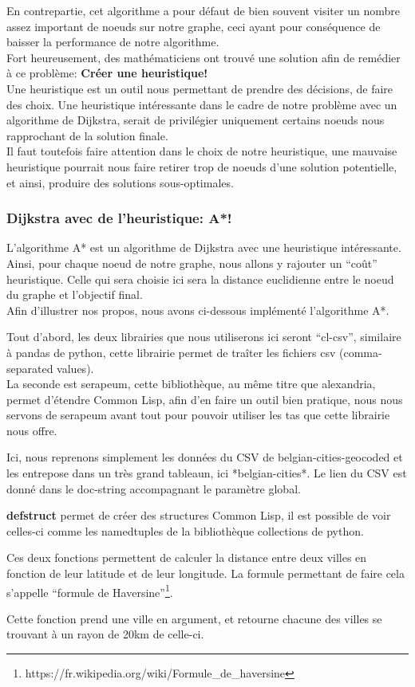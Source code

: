 \documentclass[a4paper, 12pt]{article}
\newcommand{\pather}[1]{
  
}
\numberwithin{equation}{subsection}
\begin{document}
En contrepartie, cet algorithme a pour défaut de bien souvent visiter un nombre assez important de noeuds sur notre graphe, ceci ayant pour conséquence de baisser la performance de notre algorithme. \\

Fort heureusement, des mathématiciens ont trouvé une solution afin de remédier à ce problème: {\bf Créer une heuristique!} \\

Une heuristique est un outil nous permettant de prendre des décisions, de faire des choix. Une heuristique intéressante dans le cadre de notre problème avec un algorithme de Dijkstra, serait de privilégier uniquement certains noeuds nous rapprochant de la solution finale. \\

Il faut toutefois faire attention dans le choix de notre heuristique,
une mauvaise heuristique pourrait nous faire retirer trop de noeuds d'une solution potentielle, et ainsi, produire des solutions sous-optimales. \\
\subsubsection{Dijkstra avec de l'heuristique: A*!}
L'algorithme A* est un algorithme de Dijkstra avec une heuristique intéressante. \\

Ainsi, pour chaque noeud de notre graphe, nous allons y rajouter un ``coût'' heuristique. Celle qui sera choisie ici sera la distance euclidienne entre le noeud du graphe et l'objectif final. \\
Afin d'illustrer nos propos, nous avons ci-dessous implémenté l'algorithme A*.
\pather{1-2}
Tout d'abord, les deux librairies que nous utiliserons ici seront ``cl-csv'', similaire à pandas de python, cette librairie permet de traîter les fichiers csv (comma-separated values). \\

La seconde est serapeum, cette bibliothèque, au même titre que alexandria, permet d'étendre Common Lisp, afin d'en faire un outil bien pratique, nous nous servons de serapeum avant tout pour pouvoir utiliser les tas que cette librairie nous offre.
\pather{7-25}
Ici, nous reprenons simplement les données du CSV de belgian-cities-geocoded et les entrepose dans un très grand tableaun, ici *belgian-cities*. Le lien du CSV est donné dans le doc-string accompagnant le paramètre global.
\pather{4-5}
{\bf defstruct} permet de créer des structures Common Lisp, il est possible de voir celles-ci comme les namedtuples de la bibliothèque collections de python.
\pather{28-53}
Ces deux fonctions permettent de calculer la distance entre deux villes en fonction de leur latitude et de leur longitude. La formule permettant de faire cela s'appelle ``formule de Haversine''\footnote{https://fr.wikipedia.org/wiki/Formule\_de\_haversine}.
\pather{55-62}
Cette fonction prend une ville en argument, et retourne chacune des villes se trouvant à un rayon de 20km de celle-ci. \\
\end{document}
